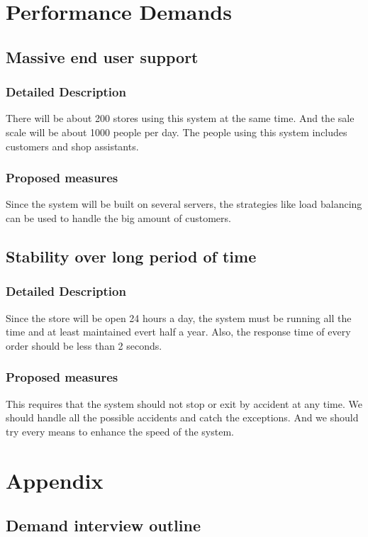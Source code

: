 \documentclass[a4paper]{report}
\begin{document}
\chapter{Performance Demands}

\section{Massive end user support}
\subsection{Detailed Description}
There will be about 200 stores using this system at the same time. And the sale scale will be about 1000 people per day. The people using this system includes customers and shop assistants.
\subsection{Proposed measures}
Since the system will be built on several servers, the strategies like load balancing can be used to handle the big amount of customers.

\section{Stability over long period of time}
\subsection{Detailed Description}
Since the store will be open 24 hours a day, the system must be running all the time and at least maintained evert half a year. Also, the response time of every order  should be less than 2 seconds.
\subsection{Proposed measures}
This requires that the system should not stop or exit by accident at any time. We should handle all the possible accidents and catch the exceptions. And we should try every means to enhance the speed of the system.

\chapter{Appendix}
\section{Demand interview outline}
\end{document}
